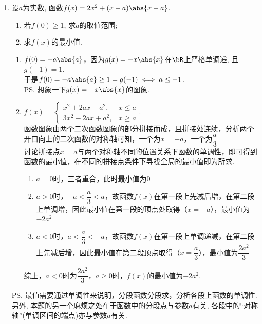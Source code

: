 \begin{enumerate}
\item 设$a$为实数, 函数$f(x)=2x^2+(x-a)\abs{x-a}$. 
\begin{enumerate}[(1)]
\item 若$f(0)\geq 1$, 求$a$的取值范围; 
\item 求$f(x)$的最小值. 
\end{enumerate}
\begin{jieda}
\begin{enumerate}[(1)]
\item $f(0)=-a\abs{a}$，因为$g(x)=-x\abs{x}$在$\bR$上严格单调递, 且$g(-1)=1$. \\
于是$f(0)=-a\abs{a}\geq 1=g(-1)\iff a\leq -1$.  \\
\ps 想象一下$g(x)=-x\abs{x}$的图象.


\item $f(x)=\begin{cases}
x^2+2ax-a^2, & x\leq a\\
3x^2-2ax+a^2, & x\geq a
\end{cases}$. \\
函数图象由两个二次函数图象的部分拼接而成，且拼接处连续，分析两个开口向上的二次函数的对称轴可知，一个为$x = -a$，一个为$\dfrac{a}{3}$ \\
讨论拼接点$x = a$与两个对称轴不同的位置关系下函数的单调性，即可得到函数的最小值，在不同的拼接点条件下寻找全局的最小值即为所求. 
\begin{enumerate}
    \item $a = 0$时，三者重合，此时最小值为$0$ 
    \item $a > 0$时，$-a < \dfrac{a}{3} < a$，故函数$f(x)$在第一段上先减后增，在第二段上单调增，因此最小值在第一段的顶点处取得（$x = -a$），最小值为$-2a^2$
    \item $a < 0$时，$a < \dfrac{a}{3} < -a$，故函数$f(x)$在第一段上单调递减，在第二段上先减后增，因此最小值在第二段顶点取得（$x = \dfrac{a}{3}$），最小值为$\dfrac{2a^2}{3}$
\end{enumerate}
综上，$a < 0$时为$\dfrac{2a^2}{3}$，$a \geq 0$时，$f(x)$的最小值为$-2a^2$. 
\end{enumerate}
\ps 最值需要通过单调性来说明，分段函数分段求，分析各段上函数的单调性.
另外, 本题的另一个麻烦之处在于函数中的分段点与参数$a$有关, 各段中的``对称轴''(单调区间的端点)亦与参数$a$有关. 
\end{jieda}

\begin{vspace_}
\vsp[5]
\end{vspace_}


\end{enumerate}

